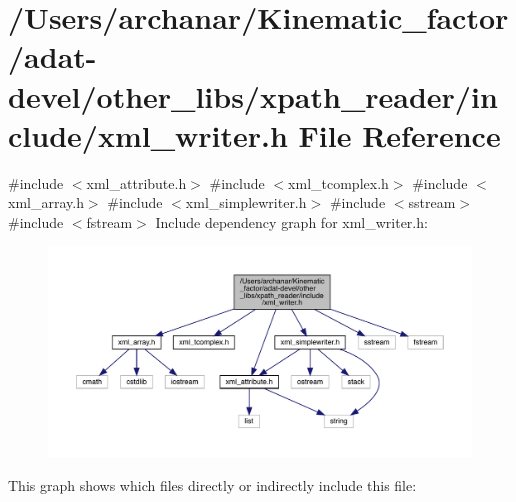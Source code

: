 \hypertarget{adat-devel_2other__libs_2xpath__reader_2include_2xml__writer_8h}{}\section{/\+Users/archanar/\+Kinematic\+\_\+factor/adat-\/devel/other\+\_\+libs/xpath\+\_\+reader/include/xml\+\_\+writer.h File Reference}
\label{adat-devel_2other__libs_2xpath__reader_2include_2xml__writer_8h}
{\ttfamily \#include $<$xml\+\_\+attribute.\+h$>$}\newline
{\ttfamily \#include $<$xml\+\_\+tcomplex.\+h$>$}\newline
{\ttfamily \#include $<$xml\+\_\+array.\+h$>$}\newline
{\ttfamily \#include $<$xml\+\_\+simplewriter.\+h$>$}\newline
{\ttfamily \#include $<$sstream$>$}\newline
{\ttfamily \#include $<$fstream$>$}\newline
Include dependency graph for xml\+\_\+writer.\+h\+:
\nopagebreak
\begin{figure}[H]
\begin{center}
\leavevmode
\includegraphics[width=350pt]{dc/d85/adat-devel_2other__libs_2xpath__reader_2include_2xml__writer_8h__incl}
\end{center}
\end{figure}
This graph shows which files directly or indirectly include this file\+:
\nopagebreak
